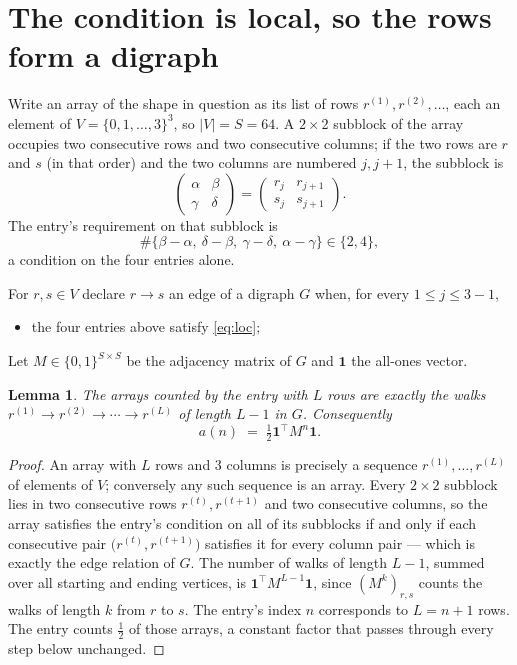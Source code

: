 \documentclass[11pt,a4paper]{article}
\theoremstyle{plain}
\newtheorem{lemma}[theorem]{Lemma}
\theoremstyle{definition}
\begin{document}
\section{The condition is local, so the rows form a digraph}

Write an array of the shape in question as its list of rows
$r^{(1)},r^{(2)},\dots$, each an element of
$V=\{0,1,\dots,3\}^{3}$, so $|V|=S=64$. A $2\times2$ subblock of the array
occupies two consecutive rows and two consecutive columns; if the two rows are $r$
and $s$ (in that order) and the two columns are numbered $j,j+1$,
the subblock is
\[
\begin{pmatrix}\alpha&\beta\\\gamma&\delta\end{pmatrix}=\begin{pmatrix}r_j&r_{j+1}\\s_j&s_{j+1}\end{pmatrix}.
\]
The entry's requirement on that subblock is
\begin{equation}\label{eq:loc}
\#\{\beta-\alpha,\ \delta-\beta,\ \gamma-\delta,\ \alpha-\gamma\}\in\{2,4\},
\end{equation}
a condition on the four entries alone.

For $r,s\in V$ declare $r\to s$ an edge of a digraph $G$ when, for every
$1\le j\le 3-1$,
\begin{itemize}
\item the four entries above satisfy \eqref{eq:loc};

\end{itemize}
Let $M\in\{0,1\}^{S\times S}$ be the adjacency matrix of $G$ and $\mathbf{1}$ the
all-ones vector.

\begin{lemma}\label{lem:walk}
The arrays counted by the entry with $L$ rows are exactly the walks
$r^{(1)}\to r^{(2)}\to\cdots\to r^{(L)}$ of length $L-1$ in $G$. Consequently
\[
a(n)\;=\;\tfrac1{2}\mathbf{1}^{\!\top}M^{n}\mathbf{1} .
\]
\end{lemma}

\begin{proof}
An array with $L$ rows and $3$ columns is precisely a sequence
$r^{(1)},\dots,r^{(L)}$ of elements of $V$; conversely any such sequence is an array.
Every $2\times2$ subblock lies in two consecutive rows $r^{(t)},r^{(t+1)}$ and two
consecutive columns, so the array satisfies the entry's condition on all of its subblocks
if and only if each consecutive pair $\bigl(r^{(t)},r^{(t+1)}\bigr)$ satisfies it for
every column pair --- which is exactly the edge relation of $G$. The number of walks of
length $L-1$, summed over all starting and ending vertices, is
$\mathbf{1}^{\!\top}M^{L-1}\mathbf{1}$, since $(M^{k})_{r,s}$ counts the walks of
length $k$ from $r$ to $s$. The entry's index $n$ corresponds to $L=n+1$ rows. The entry counts $\tfrac1{2}$ of those arrays, a constant factor that passes through every step below unchanged.
\end{proof}
\end{document}
